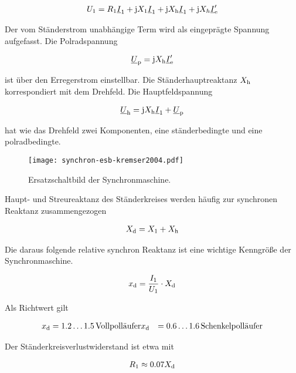 \begin{align}
U_{\mathrm{1}} = R_{\mathrm{1}}\underline{I}_{\mathrm{1}} + \mathrm{j}X_{\mathrm{1}}\underline{I}_{\mathrm{1}} + \mathrm{j}X_{\mathrm{h}}\underline{I}_{\mathrm{1}} + \mathrm{j}X_{h}\underline{I}'_{\mathrm{e}}
\end{align}

Der vom Ständerstrom unabhängige Term wird als eingeprägte Spannung aufgefasst.
Die Polradspannung

\begin{align}
\underline{U}_{\mathrm{p}} = \mathrm{j}X_{\mathrm{h}}\underline{I}'_{\mathrm{e}}
\end{align}

ist über den Erregerstrom einstellbar.
Die Ständerhauptreaktanz $X_{\mathrm{h}}$ korrespondiert mit dem Drehfeld.
Die Hauptfeldspannung

\begin{align}
\underline{U}_{\mathrm{h}} = \mathrm{j} X_{\mathrm{h}} \underline{I}_{\mathrm{1}} + \underline{U}_{\mathrm{p}}
\end{align}

hat wie das Drehfeld zwei Komponenten, eine ständerbedingte und eine polradbedingte.

\begin{figure}[!htb]
\centering
\texttt{[image: synchron-esb-kremser2004.pdf]}
\label{fig:esb-kremser}
\caption{Ersatzschaltbild der Synchronmaschine.}
\end{figure}

Haupt- und Streureaktanz des Ständerkreises werden häufig zur synchronen Reaktanz zusammengezogen

\begin{align}
X_{\mathrm{d}} = X_{\mathrm{1}} + X_{\mathrm{h}}
\end{align}

Die daraus folgende relative synchron Reaktanz ist eine wichtige Kenngröße der Synchronmaschine.

\begin{align}
x_{\mathrm{d}} = \frac{I_{\mathrm{1}}}{U_{\mathrm{1}}}\cdot X_{\mathrm{d}}
\end{align}

Als Richtwert gilt

\begin{align*}
x_{\mathrm{d}} &= 1.2 \ldots 1.5\,\text{Vollpolläufer}
x_{\mathrm{d}} &= 0.6 \ldots 1.6\,\text{Schenkelpolläufer}
\end{align*}

Der Ständerkreisverlustwiderstand ist etwa mit 

\begin{align}
R_{\mathrm{1}} \approx 0.07 X_{\mathrm{d}}
\end{align}

